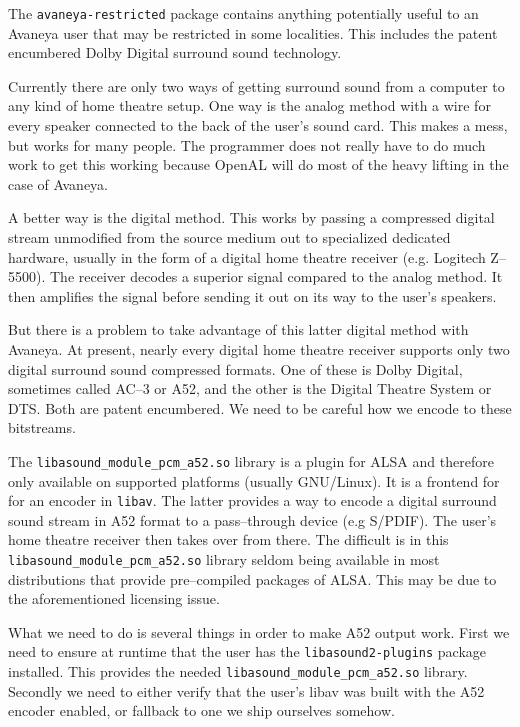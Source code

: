 
The {\tt avaneya-restricted} package contains anything potentially useful to an Avaneya user that may be restricted in some localities. This includes the patent encumbered Dolby Digital surround sound technology.

Currently there are only two ways of getting surround sound from a computer to any kind of home theatre setup. One way is the analog method with a wire for every speaker connected to the back of the user's sound card. This makes a mess, but works for many people. The programmer does not really have to do much work to get this working because OpenAL will do most of the heavy lifting in the case of Avaneya.

A better way is the digital method. This works by passing a compressed digital stream unmodified from the source medium out to specialized dedicated hardware, usually in the form of a digital home theatre receiver (e.g. Logitech Z--5500). The receiver decodes a superior signal compared to the analog method. It then amplifies the signal before sending it out on its way to the user's speakers. 

But there is a problem to take advantage of this latter digital method with Avaneya. At present, nearly every digital home theatre receiver supports only two digital surround sound compressed formats. One of these is Dolby Digital, sometimes called AC--3 or A52, and the other is the Digital Theatre System or DTS. Both are patent encumbered. We need to be careful how we encode to these bitstreams.

The {\tt libasound_module_pcm_a52.so} library is a plugin for ALSA and therefore only available on supported platforms (usually GNU/Linux). It is a frontend for for an encoder in {\tt libav}. The latter provides a way to encode a digital surround sound stream in A52 format to a pass--through device (e.g S/PDIF). The user's home theatre receiver then takes over from there. The difficult is in this {\tt libasound_module_pcm_a52.so} library seldom being available in most distributions that provide pre--compiled packages of ALSA. This may be due to the aforementioned licensing issue. 

What we need to do is several things in order to make A52 output work. First we need to ensure at runtime that the user has the {\tt libasound2-plugins} package installed. This provides the needed {\tt libasound_module_pcm_a52.so} library. Secondly we need to either verify that the user's libav was built with the A52 encoder enabled, or fallback to one we ship ourselves somehow.

